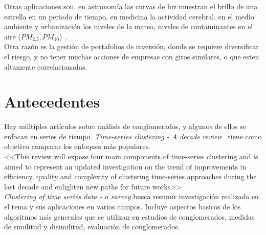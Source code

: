 \documentclass[twocolumn,10pt]{asme2ej}
\begin{document}
Otras aplicaciones son, en astronom\'ia las curvas de luz muestran el brillo de una estrella en un periodo de tiempo, en medicina la actividad cerebral, en el medio ambiente y urbanizaci\'on los niveles de la marea, niveles de contaminantes en el aire ($PM_{2.5}, PM_{10}$)~\cite{TIME_SERIES_CLUSTERING}.\\

Otra raz\'on es la gesti\'on de portafolios de inversi\'on, donde se requiere diversificar el riesgo, y no tener muchas acciones de empresas con giros similares, o que esten altamente correlacionadas.

\section{Antecedentes} %
\label{sec:antecedentes}
Hay m\'ultiples art\'iculos sobre an\'alisis de conglomerados, y algunos de ellos se enfocan en series de tiempo. \textit{Time-series clustering - A decade review}~\cite{TIME_SERIES_CLUSTERING} tiene como objetivo comparar los enfoques m\'as populares.\\
<<This review will expose four main components of time-series clustering and is aimed to represent an updated investigation on the trend of improvements in efficiency, quality and complexity of clustering time-series approaches during the last decade and enlighten new paths for future works>>~\cite{TIME_SERIES_CLUSTERING}\\

\textit{Clustering of time series data - a survey} busca resumir investigaci\'on realizada en el tema y sus aplicaciones en varios campos. Incluye aspectos basicos de los algoritmos m\'as generales que se utilizan en estudios de conglomerados, medidas de similitud y disimilitud, evaluaci\'on de conglomerados.~\cite{TIME_SERIES_CLUSTERING_3}\\
\end{document}

